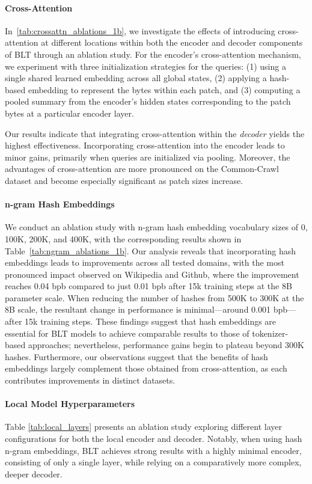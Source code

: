 \paragraph{Cross-Attention} 
In~\autoref{tab:crossattn_ablations_1b}, we investigate the effects of introducing cross-attention at different locations within both the encoder and decoder components of {\textsc BLT} through an ablation study. For the encoder’s cross-attention mechanism, we experiment with three initialization strategies for the queries: (1) using a single shared learned embedding across all global states, (2) applying a hash-based embedding to represent the bytes within each patch, and (3) computing a pooled summary from the encoder’s hidden states corresponding to the patch bytes at a particular encoder layer.

Our results indicate that integrating cross-attention within the \textit{decoder} yields the highest effectiveness. Incorporating cross-attention into the encoder leads to minor gains, primarily when queries are initialized via pooling. Moreover, the advantages of cross-attention are more pronounced on the Common-Crawl dataset and become especially significant as patch sizes increase.

\paragraph{n-gram Hash Embeddings} 

We conduct an ablation study with n-gram hash embedding vocabulary sizes of 0, 100K, 200K, and 400K, with the corresponding results shown in Table~\ref{tab:ngram_ablations_1b}. Our analysis reveals that incorporating hash embeddings leads to improvements across all tested domains, with the most pronounced impact observed on Wikipedia and Github, where the improvement reaches 0.04 bpb compared to just 0.01 bpb after 15k training steps at the 8B parameter scale. When reducing the number of hashes from 500K to 300K at the 8B scale, the resultant change in performance is minimal—around 0.001 bpb—after 15k training steps. These findings suggest that hash embeddings are essential for {\textsc BLT} models to achieve comparable results to those of tokenizer-based approaches; nevertheless, performance gains begin to plateau beyond 300K hashes. Furthermore, our observations suggest that the benefits of hash embeddings largely complement those obtained from cross-attention, as each contributes improvements in distinct datasets.

\paragraph{Local Model Hyperparameters} Table \ref{tab:local_layers} presents an ablation study exploring different layer configurations for both the local encoder and decoder. Notably, when using hash n-gram embeddings, {\textsc BLT} achieves strong results with a highly minimal encoder, consisting of only a single layer, while relying on a comparatively more complex, deeper decoder.

